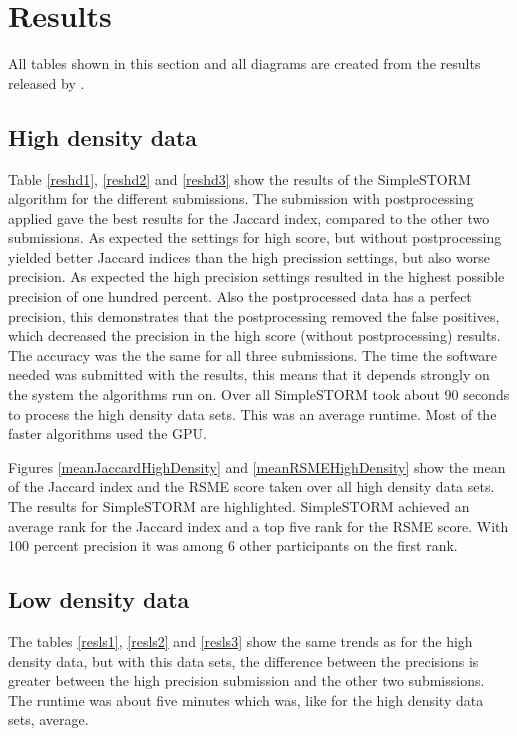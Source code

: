 \section{Results}
All tables shown in this section and all diagrams are created from the results released by \cite{challenge}.
\subsection{High density data}
Table \ref{reshd1}, \ref{reshd2} and \ref{reshd3} show the results of the SimpleSTORM algorithm for the different submissions. The submission with postprocessing applied gave the best results for the Jaccard index, compared to the other two submissions. As expected the settings for high score, but without postprocessing yielded better Jaccard indices than the high precission settings, but also worse precision. As expected the high precision settings resulted in the highest possible precision of one hundred percent. Also the postprocessed data has a perfect precision, this demonstrates that the postprocessing removed the false positives, which decreased the precision in the high score (without postprocessing) results. The accuracy was the the same for all three submissions.\newline
The time the software needed was submitted with the results, this means that it depends strongly on the system the algorithms run on. Over all SimpleSTORM took about 90 seconds to process the high density data sets. This was an average runtime. Most of the faster algorithms used the GPU.

Figures \ref{meanJaccardHighDensity} and \ref{meanRSMEHighDensity} show the mean of the Jaccard index and the RSME score taken over all high density data sets. The results for SimpleSTORM are highlighted. SimpleSTORM achieved an average rank for the Jaccard index and a top five rank for the RSME score. With 100 percent precision it was among 6 other participants on the first rank.




\subsection{Low density data}
The tables \ref{resls1}, \ref{resls2} and \ref{resls3} show the same trends as for the high density data, but with this data sets, the difference between the precisions is greater between the high precision submission and the other two submissions. The runtime was about five minutes which was, like for the high density data sets, average.



